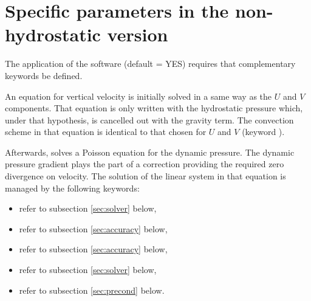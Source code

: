\section{Specific parameters in the non-hydrostatic version}

The application of the software  (default = YES)
requires that complementary keywords be defined.

An equation for vertical velocity is initially solved in a same way as the
$U$ and $V$ components. That equation is only written with the
hydrostatic pressure which, under that hypothesis, is cancelled out with the
gravity term. The convection scheme in that equation is identical to that
chosen for $U$ and $V$ (keyword ).
%
%
%
%

Afterwards,  solves a Poisson equation for the dynamic pressure. The
dynamic pressure gradient plays the part of a correction providing the required
zero divergence on velocity. The solution of the linear system in that equation
is managed by the following keywords:

\begin{itemize}
\item {} refer to subsection \ref{sec:solver} below,

\item {} refer to subsection \ref{sec:accuracy}
below,

\item {} refer to subsection \ref{sec:accuracy} below,

\item {} refer to subsection \ref{sec:solver} below,

\item {} refer to subsection \ref{sec:precond} below.
\end{itemize}

